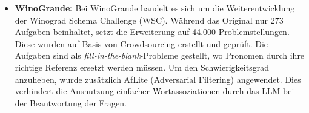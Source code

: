 \begin{itemize}
	\item \textbf{WinoGrande:} Bei WinoGrande handelt es sich um die Weiterentwicklung der Winograd Schema Challenge (WSC). Während das Original nur 273 Aufgaben beinhaltet, setzt die Erweiterung auf 44.000 Problemstellungen. Diese wurden auf Basis von Crowdsourcing erstellt und geprüft. Die Aufgaben sind als \textit{fill-in-the-blank}-Probleme gestellt, wo Pronomen durch ihre richtige Referenz ersetzt werden müssen. Um den Schwierigkeitsgrad anzuheben, wurde zusätzlich AfLite (Adversarial Filtering) angewendet. Dies verhindert die Ausnutzung einfacher Wortassoziationen durch das LLM bei der Beantwortung der Fragen.\autocite[Vgl.][S. 1-3]{sakaguchi2019winogrande}
\end{itemize}

\newpage
